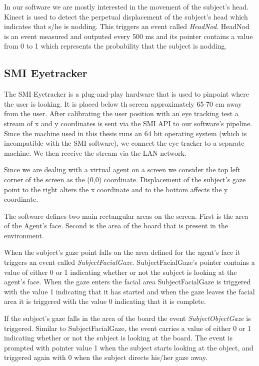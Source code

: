 \documentclass[12pt, a4paper, fleqn]{memoir}%
\begin{document}
In our software we are mostly interested in the movement of the subject's head. Kinect is used to detect the perpetual displacement of the subject's head which indicates that s/he is nodding. This triggers an event called \textit{HeadNod}. HeadNod is an event measured and outputed every 500 ms and its pointer contains a value from 0 to 1 which represents the probability that the subject is nodding.

\subsection{SMI Eyetracker}
The SMI Eyetracker is a plug-and-play hardware that is used to pinpoint where the user is looking. It is placed below th screen approximately 65-70 cm away from the user. After calibrating the user position with an eye tracking test a stream of x and y coordinates is sent via the SMI API to our software's pipeline. Since the machine used in this thesis runs an 64 bit operating system (which is incompatible with the SMI software), we connect the eye tracker to a separate machine. We then receive the stream via the LAN network.

Since we are dealing with a virtual agent on a screen we consider the top left corner of the screen as the (0,0) coordinate. Displacement of the subject's gaze point to the right alters the x coordinate and to the bottom affects the y coordinate.

The software defines two main rectangular areas on the screen. First is the area of the Agent's face. Second is the area of the board that is present in the environment.

When the subject's gaze point falls on the area defined for the agent's face it triggers an event called \textit{SubjectFacialGaze}. SubjectFacialGaze's pointer contains a value of either 0 or 1 indicating whether or not the subject is looking at the agent's face. When the gaze enters the facial area SubjectFacialGaze is triggered with the value 1 indicating that it has started and when the gaze leaves the facial area it is triggered with the value 0 indicating that it is complete.

If the subject's gaze falls in the area of the board the event \textit{SubjectObjectGaze} is triggered. Similar to SubjectFacialGaze, the event carries a value of either 0 or 1 indicating whether or not the subject is looking at the board. The event is prompted with pointer value 1 when the subject starts looking at the object, and triggered again with 0 when the subject directs his/her gaze away.
\end{document}
